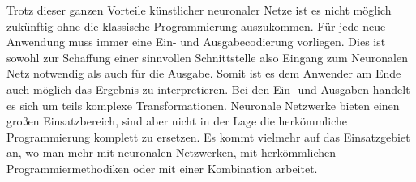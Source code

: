 Trotz dieser ganzen Vorteile künstlicher neuronaler Netze ist es nicht möglich zukünftig ohne die klassische Programmierung auszukommen. Für jede neue Anwendung muss immer eine Ein- und Ausgabecodierung vorliegen. Dies ist sowohl zur Schaffung einer sinnvollen Schnittstelle also Eingang zum Neuronalen Netz notwendig als auch für die Ausgabe. Somit ist es dem Anwender am Ende auch möglich das Ergebnis zu interpretieren. Bei den Ein- und Ausgaben handelt es sich um teils komplexe Transformationen. Neuronale Netzwerke bieten einen großen Einsatzbereich, sind aber nicht in der Lage die herkömmliche Programmierung komplett zu ersetzen. Es kommt vielmehr auf das Einsatzgebiet an, wo man mehr mit neuronalen Netzwerken, mit herkömmlichen Programmiermethodiken oder mit einer Kombination arbeitet.